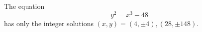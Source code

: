 \begin{proposition}
    The equation
\[
    y^2=x^3-48
\]
    has only the integer solutions $(x,y)=(4,\pm4),(28,\pm148)$.
\end{proposition}

